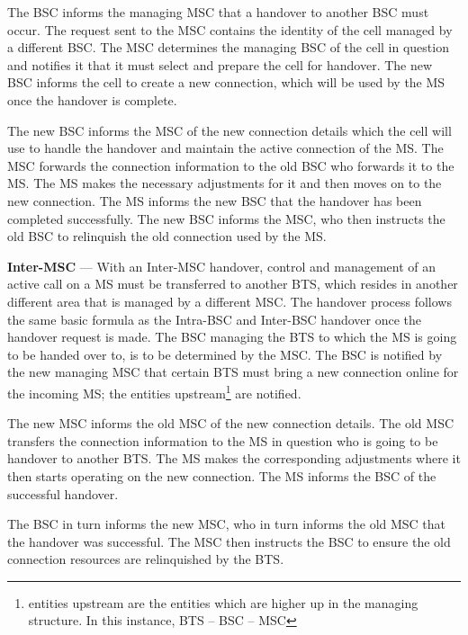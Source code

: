 \begin{description}
The BSC informs the managing MSC that a handover to another BSC must occur. The request sent to the MSC contains the identity of the cell managed by a different BSC. The MSC determines the managing BSC of the cell in question and notifies it that it must select and prepare the cell for handover. The new BSC informs the cell to create a new connection, which will be used by the MS once the handover is complete\cite{wirelesstelcoMullet,GSMArchitectureProtocolsServices}.

The new BSC informs the MSC of the new connection details which the cell will use to handle the handover and maintain the active connection of the MS. The MSC forwards the connection information to the old BSC who forwards it to the MS. The MS makes the necessary adjustments for it and then moves on to the new connection. The MS informs the new BSC that the handover has been completed successfully. The new BSC informs the MSC, who then instructs the old BSC to relinquish the old connection used by the MS\cite{wirelesstelcoMullet,GSMArchitectureProtocolsServices}.
\item{\textbf{Inter-MSC}} --- With an Inter-MSC handover, control and management of an active call on a MS must be transferred to another BTS, which resides in another different area that is managed by a different MSC. The handover process follows the same basic formula as the Intra-BSC and Inter-BSC handover once the handover request is made\cite{wirelesstelcoMullet,GSMArchitectureProtocolsServices}.
The BSC managing the BTS to which the MS is going to be handed over to, is to be determined by the MSC. The BSC is notified by the new managing MSC that certain BTS must bring a new connection online for the incoming MS; the entities upstream\footnote{entities upstream are the entities which are higher up in the managing structure. In this instance, BTS -- BSC -- MSC} are notified\cite{wirelesstelcoMullet,GSMArchitectureProtocolsServices}.

The new MSC informs the old MSC of the new connection details. The old MSC transfers the connection information to the MS in question who is going to be handover to another BTS. The MS makes the corresponding adjustments where it then starts operating on the new connection. The MS informs the BSC of the successful handover\cite{wirelesstelcoMullet,GSMArchitectureProtocolsServices}. 

The BSC in turn informs the new MSC, who in turn informs the old MSC that the handover was successful. The MSC then instructs the BSC to ensure the old connection resources are relinquished by the BTS.
\end{description}

